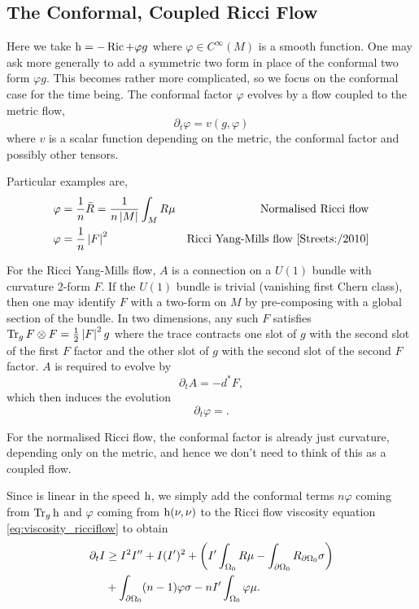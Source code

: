 \documentclass{amsart}
\begin{document}
\subsection{The Conformal, Coupled Ricci Flow }
\label{subsec:flows_ricci_coupled}

Here we take \(\operatorname{h} = -\operatorname{Ric} + \varphi g\) where \(\varphi \in C^{\infty}(M)\) is a smooth function. One may ask more generally to add a symmetric two form in place of the conformal two form \(\varphi g\). This becomes rather more complicated, so we focus on the conformal case for the time being. The conformal factor \(\varphi\) evolves by a flow coupled to the metric flow,
\[
\partial_t \varphi = v(g, \varphi)
\]
where \(v\) is a scalar function depending on the metric, the conformal factor and possibly other tensors.

Particular examples are,
\begin{align*}
\varphi &= \frac{1}{n} \bar{R} = \frac{1}{n\left|{M}\right|} \int_M R \mu & \text{Normalised Ricci flow} \\
\varphi &= \frac{1}{n} \left|{F}\right|^2 & \text{Ricci Yang-Mills flow \cite{Streets:/2010}}
\end{align*}

For the Ricci Yang-Mills flow, \(A\) is a connection on a \(U(1)\) bundle with curvature 2-form \(F\). If the \(U(1)\) bundle is trivial (vanishing first Chern class), then one may identify \(F\) with a two-form on \(M\) by pre-composing with a global section of the bundle. In two dimensions, any such \(F\) satisfies \(\operatorname{Tr}_g F \otimes F = \tfrac{1}{2} \left|{F}\right|^2 g\) where the trace contracts one slot of \(g\) with the second slot of the first \(F\) factor and the other slot of \(g\) with the second slot of the second \(F\) factor. \(A\) is required to evolve by
\[
\partial_t A = -d^{\ast} F,
\]
which then induces the evolution
\[
\partial_t \varphi = .
\]

For the normalised Ricci flow, the conformal factor is already just curvature, depending only on the metric, and hence we don't need to think of this as a coupled flow.

Since  is linear in the speed \(\operatorname{h}\), we simply add the conformal terms \(n \varphi\) coming from \(\operatorname{Tr}_g \operatorname{h}\) and \(\varphi\) coming from \(\operatorname{h}(\nu, \nu)\) to the Ricci flow viscosity equation \eqref{eq:viscosity_ricciflow} to obtain
\begin{equation}
\label{eq:viscosity_conformalcoupledricciflow}
\begin{split}
\partial_t I &\geq I^2I'' + I(I')^2 + \left(I'\int_{\Omega_0} R \mu - \int_{\partial {\Omega_0}} R_{\partial {\Omega_0}}\sigma \right) \\
&+ \int_{\partial {\Omega_0}} (n-1) \varphi\sigma - n I' \int_{\Omega_0} \varphi \mu.
\end{split}
\end{equation}
\end{document}
